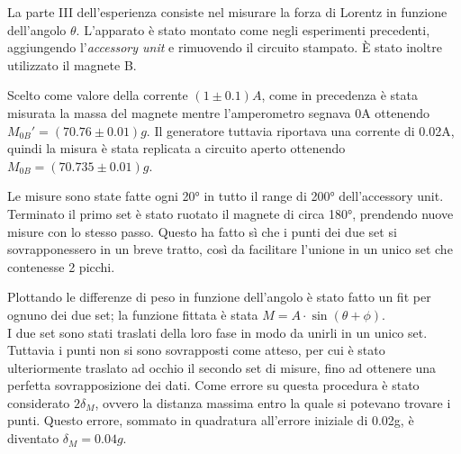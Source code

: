 {\fontsize{12}{14}\selectfont 

La parte III dell'esperienza consiste nel misurare la forza di Lorentz in funzione dell'angolo $\theta$. L'apparato è stato montato come negli esperimenti precedenti, aggiungendo l'\emph{accessory unit} e rimuovendo il circuito stampato. È stato inoltre utilizzato il magnete B.
\par
Scelto come valore della corrente $(1 \pm 0.1) A$, come in precedenza è stata misurata la massa del magnete mentre l'amperometro segnava 0A ottenendo $M_{0B}' = (70.76 \pm 0.01) g$. Il generatore tuttavia riportava una corrente di 0.02A, quindi la misura è stata replicata a circuito aperto ottenendo $M_{0B} = (70.735 \pm 0.01) g$.
\par
Le misure sono state fatte ogni 20° in tutto il range di 200° dell'accessory unit. Terminato il primo set è stato ruotato il magnete di circa 180°, prendendo nuove misure con lo stesso passo. Questo ha fatto sì che i punti dei due set si sovrapponessero in un breve tratto, così da facilitare l'unione in un unico set che contenesse 2 picchi.
\par
Plottando le differenze di peso in funzione dell'angolo è stato fatto un fit per ognuno dei due set; la funzione fittata è stata $M = A\cdot \sin(\theta + \phi)$.
\\
I due set sono stati traslati della loro fase in modo da unirli in un unico set. Tuttavia i punti non si sono sovrapposti come atteso, per cui è stato ulteriormente traslato ad occhio il secondo set di misure, fino ad ottenere una perfetta sovrapposizione dei dati. Come errore su questa procedura è stato considerato $2\delta_{M}$, ovvero la distanza massima entro la quale si potevano trovare i punti. Questo errore, sommato in quadratura all'errore iniziale di 0.02g, è diventato $\delta_M = 0.04g$.

\par}